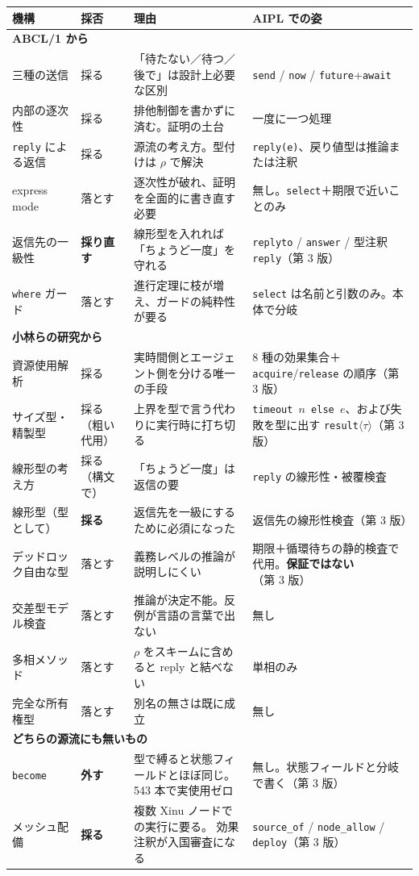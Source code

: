 \documentclass[11pt,a4paper]{ltjsarticle}
\theoremstyle{definition}
\theoremstyle{remark}
\begin{document}
\begin{center}
\small
\begin{longtable}{p{}p{}p{}p{}}
\toprule
機構 & 採否 & 理由 & AIPL での姿 \\
\midrule
\endhead
\multicolumn{4}{l}{\textbf{ABCL/1 から}}\\
\midrule
三種の送信 & 採る & 「待たない／待つ／後で」は設計上必要な区別 &
  \texttt{send} / \texttt{now} / \texttt{future}+\texttt{await} \\
内部の逐次性 & 採る & 排他制御を書かずに済む。証明の土台 & 一度に一つ処理 \\
\texttt{reply} による返信 & 採る & 源流の考え方。型付けは $\rho$ で解決 &
  \texttt{reply(e)}、戻り値型は推論または注釈 \\
\addlinespace
express mode & 落とす & 逐次性が破れ、証明を全面的に書き直す必要 &
  無し。\texttt{select}＋期限で近いことのみ \\
返信先の一級性 & \textbf{採り直す} & 線形型を入れれば「ちょうど一度」を守れる &
  \texttt{replyto} / \texttt{answer} / 型注釈 \texttt{reply}（第 3 版） \\
\texttt{where} ガード & 落とす & 進行定理に枝が増え、ガードの純粋性が要る &
  \texttt{select} は名前と引数のみ。本体で分岐 \\
\midrule
\multicolumn{4}{l}{\textbf{小林らの研究から}}\\
\midrule
資源使用解析 & 採る & 実時間側とエージェント側を分ける唯一の手段 &
  8 種の効果集合＋\texttt{acquire}/\texttt{release} の順序（第 3 版） \\
サイズ型・精製型 & 採る（粗い代用） & 上界を型で言う代わりに実行時に打ち切る &
  \texttt{timeout $n$ else $e$}、および失敗を型に出す
  \texttt{result}$\langle\tau\rangle$（第 3 版） \\
線形型の考え方 & 採る（構文で） & 「ちょうど一度」は返信の要 &
  \texttt{reply} の線形性・被覆検査 \\
\addlinespace
線形型（型として） & \textbf{採る} & 返信先を一級にするために必須になった &
  返信先の線形性検査（第 3 版） \\
デッドロック自由な型 & 落とす & 義務レベルの推論が説明しにくい &
  期限＋循環待ちの静的検査で代用。\textbf{保証ではない}（第 3 版） \\
交差型モデル検査 & 落とす & 推論が決定不能。反例が言語の言葉で出ない & 無し \\
多相メソッド & 落とす & $\rho$ をスキームに含めると reply と結べない & 単相のみ \\
完全な所有権型 & 落とす & 別名の無さは既に成立 & 無し \\
\midrule
\multicolumn{4}{l}{\textbf{どちらの源流にも無いもの}}\\
\midrule
\texttt{become} & \textbf{外す} & 型で縛ると状態フィールドとほぼ同じ。
  543 本で実使用ゼロ & 無し。状態フィールドと分岐で書く（第 3 版） \\
\addlinespace
メッシュ配備 & \textbf{採る} & 複数 Xinu ノードでの実行に要る。
  効果注釈が入国審査になる &
  \texttt{source\_of} / \texttt{node\_allow} / \texttt{deploy}（第 3 版） \\
\bottomrule
\end{longtable}
\end{center}
\end{document}
